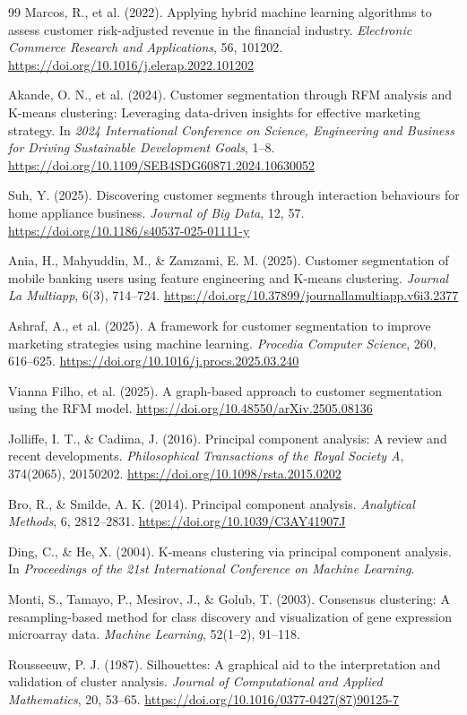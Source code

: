 \documentclass[10pt]{article}
\begin{document}
\begin{thebibliography}{99}
Marcos, R., et al. (2022).
Applying hybrid machine learning algorithms to assess customer risk-adjusted revenue in the financial industry.
\textit{Electronic Commerce Research and Applications}, 56, 101202.
\url{https://doi.org/10.1016/j.elerap.2022.101202}

Akande, O. N., et al. (2024).
Customer segmentation through RFM analysis and K-means clustering: Leveraging data-driven insights for effective marketing strategy.
In \textit{2024 International Conference on Science, Engineering and Business for Driving Sustainable Development Goals}, 1--8.
\url{https://doi.org/10.1109/SEB4SDG60871.2024.10630052}

Suh, Y. (2025).
Discovering customer segments through interaction behaviours for home appliance business.
\textit{Journal of Big Data}, 12, 57.
\url{https://doi.org/10.1186/s40537-025-01111-y}

Ania, H., Mahyuddin, M., \& Zamzami, E. M. (2025).
Customer segmentation of mobile banking users using feature engineering and K-means clustering.
\textit{Journal La Multiapp}, 6(3), 714--724.
\url{https://doi.org/10.37899/journallamultiapp.v6i3.2377}

Ashraf, A., et al. (2025).
A framework for customer segmentation to improve marketing strategies using machine learning.
\textit{Procedia Computer Science}, 260, 616--625.
\url{https://doi.org/10.1016/j.procs.2025.03.240}

Vianna Filho, et al. (2025).
A graph-based approach to customer segmentation using the RFM model.
\url{https://doi.org/10.48550/arXiv.2505.08136}

Jolliffe, I. T., \& Cadima, J. (2016).
Principal component analysis: A review and recent developments.
\textit{Philosophical Transactions of the Royal Society A}, 374(2065), 20150202.
\url{https://doi.org/10.1098/rsta.2015.0202}

Bro, R., \& Smilde, A. K. (2014).
Principal component analysis.
\textit{Analytical Methods}, 6, 2812--2831.
\url{https://doi.org/10.1039/C3AY41907J}

Ding, C., \& He, X. (2004).
K-means clustering via principal component analysis.
In \textit{Proceedings of the 21st International Conference on Machine Learning}.

Monti, S., Tamayo, P., Mesirov, J., \& Golub, T. (2003).
Consensus clustering: A resampling-based method for class discovery and visualization of gene expression microarray data.
\textit{Machine Learning}, 52(1--2), 91--118.

Rousseeuw, P. J. (1987).
Silhouettes: A graphical aid to the interpretation and validation of cluster analysis.
\textit{Journal of Computational and Applied Mathematics}, 20, 53--65.
\url{https://doi.org/10.1016/0377-0427(87)90125-7}

\end{thebibliography}
\end{document}
